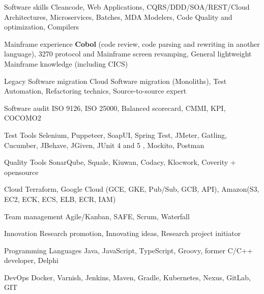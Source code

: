 

\begin{cvskills}

  \cvskill
  {Software skills} %
  {Cleancode, Web Applications, CQRS/DDD/SOA/REST/Cloud Architectures, Microservices, Batches, MDA Modelers, Code Quality and optimization, Compilers} %

  \cvskill
  {Mainframe experience} %
  {\textbf{Cobol} (code review, code parsing and rewriting in another language), 3270 protocol and Mainframe screen revamping, General lightweight Mainframe knowledge (including CICS)} %

  \cvskill
  {Legacy Software migration} %
  {Cloud Software migration (Monoliths), Test Automation, Refactoring technics, Source-to-source expert} %


  \cvskill
  {Software audit} %
  {ISO 9126, ISO 25000, Balanced scorecard, CMMI, KPI, COCOMO2} %

  \cvskill
  {Test Tools} %
  {Selenium, Puppeteer, SoapUI, Spring Test, JMeter, Gatling, Cucumber, JBehave, JGiven, JUnit 4 and 5 , Mockito, Postman} %

  \cvskill
  {Quality Tools} %
  {SonarQube, Squale, Kiuwan, Codacy, Klocwork, Coverity + opensource} %


  \cvskill
  {Cloud} %
  {Terraform, Google Cloud (GCE, GKE, Pub/Sub, GCB, API), Amazon(S3, EC2, ECK, ECS, ELB, ECR, IAM)} %


  \cvskill
  {Team management} %
  {Agile/Kanban, SAFE, Scrum, Waterfall} %

  \cvskill
  {Innovation} %
  {Research promotion, Innovating ideas, Research project initiator} %

  \cvskill
  {Programming Languages} %
  {Java, JavaScript, TypeScript, Groovy, former C/C++ developer, Delphi} %
  
  \cvskill
  {DevOps} %
  {Docker, Varnish, Jenkins, Maven, Gradle, Kubernetes, Nexus, GitLab, GIT} %
  

\end{cvskills}
